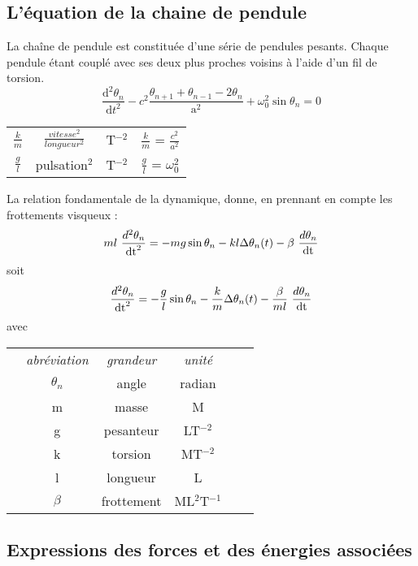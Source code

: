 \label{chaineDePendule}
\subsection{L'équation de la chaine de pendule}
La chaîne de pendule est constituée d'une série de pendules pesants. Chaque pendule étant couplé avec ses deux plus proches voisins à l'aide d'un fil de torsion.\cite{sine-gordon}\cite{chaine-pendule}
\[
\frac{\mathrm d^2\theta _n}{\mathrm d t^2} - c^2 \frac{\theta _{n+1} + \theta _{n-1} - 2 \theta _n}{\mathrm{a} ^2} + \omega _0 ^2 \sin \theta _n = 0
\]
%
\begin{center}
\begin{tabular}{cccc}
$\frac{k}{m}$ & $\frac{vitesse^2}{longueur^2}$ & T$^{-2}$ & $\frac{k}{m}$ = $\frac{c^2}{a^2}$ \\
$\frac{g}{l}$& pulsation$^2$ & T$^{-2}$ & $\frac{g}{l}$ = $\omega _0 ^2$ \\
\end{tabular}
\end{center}

La relation fondamentale de la dynamique, donne, en prennant en compte les frottements visqueux :
\[
m l\ \frac{d^2 \theta _n}{\dt^2} =  - m g \sin{\theta _n}  -  k l \Delta \theta _n(t)  -  \beta\ \frac{d \theta _n}{\dt}
\]
soit
\[
\frac{d^2 \theta _n}{\dt^2} =  - \frac{g}{l} \sin{\theta _n}  -  \frac{k}{m} \Delta \theta _n(t)  - \frac{\beta}{ml}\ \frac{d \theta _n}{\dt}
\]
avec
\begin{center}
\begin{tabular}{cccccc}
 & {\it abréviation} & {\it grandeur} & {\it unité} &  \\
 & $\theta _n$ & angle & radian &  \\
 & m & masse & M &  \\
 & g & pesanteur & LT$^{-2}$ &  \\
 & k & torsion & MT$^{-2}$ &  \\
 & l & longueur & L &  \\
 & $\beta$ & frottement & ML$^{2}$T$^{-1}$ &  \\
\end{tabular}
\end{center}
%
\subsection{Expressions des forces et des énergies associées}

